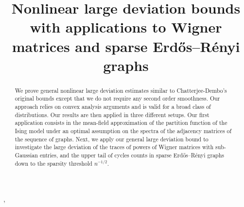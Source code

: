 \documentclass[aop,preprint]{imsart}
\numberwithin{equation}{section}
\theoremstyle{definition}
\theoremstyle{plain}
\theoremstyle{remark}
\begin{document}
\begin{frontmatter}
\title{Nonlinear large deviation bounds with applications to Wigner matrices and sparse Erd\H{o}s--R\'enyi graphs}


\begin{aug}
\author{ },




\address{
Faculty of Mathematics and Computer Science\\
 The Weizmann Institute of Science\\
234 Herzl Street\\
 Rehovot 7610001 Israel\\
\\
\phantom{E-mail:\ }}
\end{aug}



\begin{abstract}
We prove general nonlinear large deviation estimates similar to Chatterjee-Dembo's original bounds except that we do not require any second order smoothness. Our approach relies on convex analysis arguments and is valid for a broad class of distributions. Our results are then applied in three different setups. Our first application consists in the mean-field approximation of the partition function of the Ising model under an optimal assumption on the spectra of the adjacency matrices of the sequence of graphs. Next, we apply our general large deviation bound to investigate the large deviation of the traces of powers of Wigner matrices with sub-Gaussian entries, and the upper tail of cycles counts in sparse Erd\H{o}s--R\'enyi graphs down to the sparsity threshold $n^{-1/2}$.
\end{abstract}

\begin{keyword}[class=MSC]
\end{keyword}

\begin{keyword}
\end{keyword}

\end{frontmatter}
\end{document}
